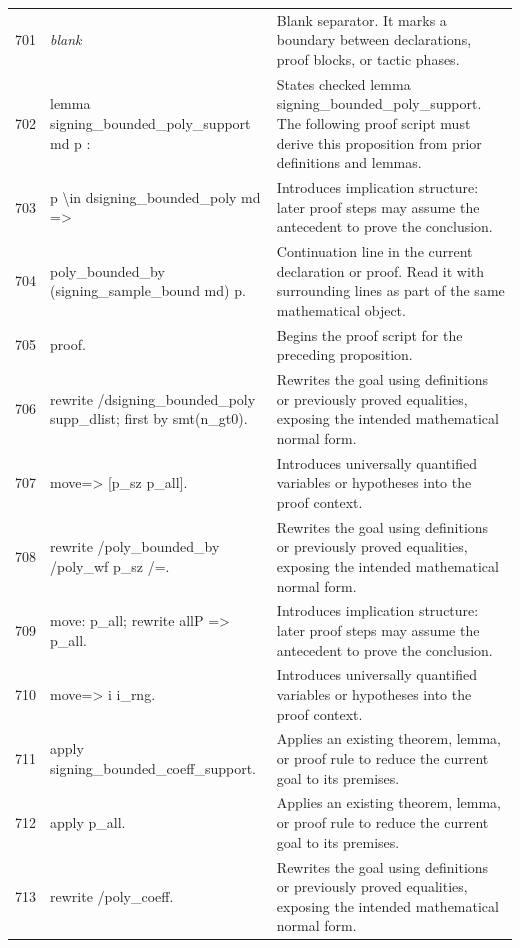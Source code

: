 \documentclass[10pt]{article}
\begin{document}
\begin{longtable}{r L{0.53\textwidth} L{0.37\textwidth}}
701 & {\ttfamily\scriptsize \emph{blank}} & Blank separator.  It marks a boundary between declarations, proof blocks, or tactic phases. \\
702 & {\ttfamily\scriptsize lemma signing\_bounded\_poly\_support md p :} & States checked lemma signing\_bounded\_poly\_support.  The following proof script must derive this proposition from prior definitions and lemmas. \\
703 & {\ttfamily\scriptsize   p \textbackslash{}in dsigning\_bounded\_poly md =>} & Introduces implication structure: later proof steps may assume the antecedent to prove the conclusion. \\
704 & {\ttfamily\scriptsize   poly\_bounded\_by (signing\_sample\_bound md) p.} & Continuation line in the current declaration or proof.  Read it with surrounding lines as part of the same mathematical object. \\
705 & {\ttfamily\scriptsize proof.} & Begins the proof script for the preceding proposition. \\
706 & {\ttfamily\scriptsize rewrite /dsigning\_bounded\_poly supp\_dlist; first by smt(n\_gt0).} & Rewrites the goal using definitions or previously proved equalities, exposing the intended mathematical normal form. \\
707 & {\ttfamily\scriptsize move=> [p\_sz p\_all].} & Introduces universally quantified variables or hypotheses into the proof context. \\
708 & {\ttfamily\scriptsize rewrite /poly\_bounded\_by /poly\_wf p\_sz /=.} & Rewrites the goal using definitions or previously proved equalities, exposing the intended mathematical normal form. \\
709 & {\ttfamily\scriptsize move: p\_all; rewrite allP => p\_all.} & Introduces implication structure: later proof steps may assume the antecedent to prove the conclusion. \\
710 & {\ttfamily\scriptsize move=> i i\_rng.} & Introduces universally quantified variables or hypotheses into the proof context. \\
711 & {\ttfamily\scriptsize apply signing\_bounded\_coeff\_support.} & Applies an existing theorem, lemma, or proof rule to reduce the current goal to its premises. \\
712 & {\ttfamily\scriptsize apply p\_all.} & Applies an existing theorem, lemma, or proof rule to reduce the current goal to its premises. \\
713 & {\ttfamily\scriptsize rewrite /poly\_coeff.} & Rewrites the goal using definitions or previously proved equalities, exposing the intended mathematical normal form. \\

\end{longtable}
\end{document}
